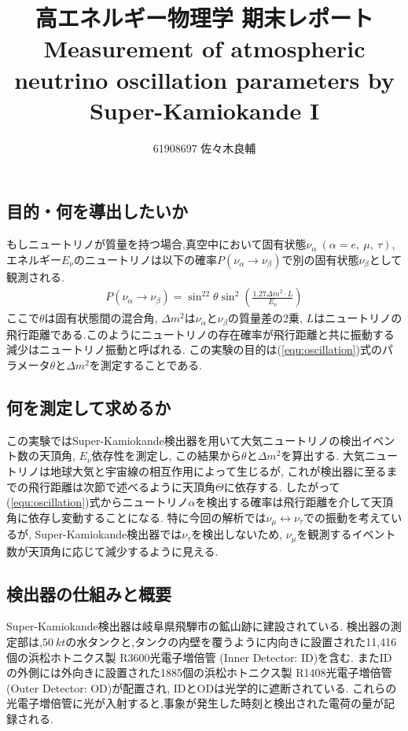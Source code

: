 \documentclass[uplatex,a4j,11pt,dvipdfmx]{jsarticle}
\begin{document}
\title{高エネルギー物理学 期末レポート\\
\fontsize{10pt}{20pt}\selectfont  Measurement of atmospheric neutrino oscillation parameters by Super-Kamiokande I \cite{PhysRevD.71.112005}}
\author{61908697 佐々木良輔}
\date{}
\maketitle
\subsection*{目的・何を導出したいか}
もしニュートリノが質量を持つ場合,真空中において固有状態$\nu_\alpha\ (\alpha=e,\ \mu,\ \tau)$, エネルギー$E_\nu$のニュートリノは以下の確率$P(\nu_\alpha\rightarrow\nu_\beta)$で別の固有状態$\nu_\beta$として観測される.
\begin{align}
  \label{equ:oscillation}
  P(\nu_\alpha\rightarrow\nu_\beta)=\sin^22\theta\sin^2\left(\frac{1.27\Delta m^2\cdot L}{E_\nu}\right)
\end{align}
ここで$\theta$は固有状態間の混合角, $\Delta m^2$は$\nu_\alpha$と$\nu_\beta$の質量差の2乗,
$L$はニュートリノの飛行距離である.このようにニュートリノの存在確率が飛行距離と共に振動する減少はニュートリノ振動と呼ばれる.
この実験の目的は(\ref{equ:oscillation})式のパラメータ$\theta$と$\Delta m^2$を測定することである.
\subsection*{何を測定して求めるか}
この実験ではSuper-Kamiokande検出器を用いて大気ニュートリノの検出イベント数の天頂角, $E_\nu$依存性を測定し,
この結果から$\theta$と$\Delta m^2$を算出する.
大気ニュートリノは地球大気と宇宙線の相互作用によって生じるが,
これが検出器に至るまでの飛行距離は次節で述べるように天頂角$\Theta$に依存する.
したがって(\ref{equ:oscillation})式からニュートリノ$\alpha$を検出する確率は飛行距離を介して天頂角に依存し変動することになる.
特に今回の解析では$\nu_\mu\leftrightarrow\nu_\tau$での振動を考えているが,
Super-Kamiokande検出器では$\nu_\tau$を検出しないため,
$\nu_\mu$を観測するイベント数が天頂角に応じて減少するように見える.
\subsection*{検出器の仕組みと概要}
Super-Kamiokande検出器は岐阜県飛騨市の鉱山跡に建設されている.
検出器の測定部は,$50\ \si{kt}$の水タンクと,タンクの内壁を覆うように内向きに設置された11,416個の浜松ホトニクス製 R3600光電子増倍管 (Inner Detector: ID)を含む.
またIDの外側には外向きに設置された1885個の浜松ホトニクス製 R1408光電子増倍管 (Outer Detector: OD)が配置され,
IDとODは光学的に遮断されている.
これらの光電子増倍管に光が入射すると,事象が発生した時刻と検出された電荷の量が記録される.
\end{document}
